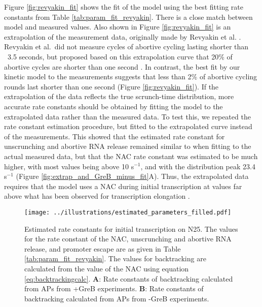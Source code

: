 Figure \ref{fig:revyakin_fit} shows the fit of the model using the best
fitting rate constants from Table \ref{tab:param_fit_revyakin}. There is a
close match between model and measured values. Also shown in Figure
\ref{fig:revyakin_fit} is an extrapolation of the measurement data, originally
made by Revyakin et al. \cite{revyakin_abortive_2006}. Revyakin et al.\ did
not measure cycles of abortive cycling lasting shorter than ~3.5 seconds, but
proposed based on this extrapolation curve that 20\% of abortive cycles are
shorter than one second \cite{revyakin_abortive_2006}.  In contrast, the best
fit by our kinetic model to the measurements suggests that less than 2\% of
abortive cycling rounds last shorter than one second (Figure
\ref{fig:revyakin_fit}). If the extrapolation of the data reflects the true
scrunch-time distribution, more accurate rate constants should be obtained by
fitting the model to the extrapolated data rather than the measured data. To
test this, we repeated the rate constant estimation procedure, but fitted to
the extrapolated curve instead of the measurements. This showed that the
estimated rate constant for unscrunching and abortive RNA release remained
similar to when fitting to the actual measured data, but that the NAC rate
constant was estimated to be much higher, with most values being above 10
s$^{-1}$, and with the distribution peak 23.4 s$^{-1}$ (Figure
\ref{fig:extrap_and_GreB_minus_fit}A). Thus, the extrapolated data requires
that the model uses a NAC during initial transcription at values far above
what has been observed for transcription elongation
\cite{revyakin_abortive_2006}.

\begin{figure}
	\begin{center}
      \texttt{[image: ../illustrations/estimated\_parameters\_filled.pdf]}
	\end{center}
    \caption{Estimated rate constants for initial transcription on N25. The
      values for the rate constant of the NAC, unscrunching and abortive RNA
      release, and promoter escape are as given in Table
      \ref{tab:param_fit_revyakin}. The values for backtracking are calculated
      from the value of the NAC using equation \eqref{eq:backtrackingcalc}.
      \textbf{A}: Rate constants of backtracking calculated from APs 
      from +GreB experiments. \textbf{B}: Rate constants of
      backtracking calculated from APs from -GreB experiments.}
    \label{fig:estimated_parameters}
\end{figure}

